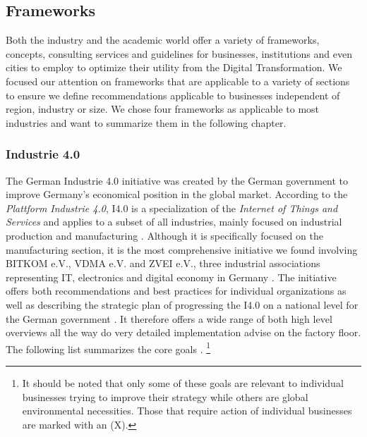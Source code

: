 \subsection{Frameworks}
\label{subsec:frameworks}



Both the industry and the academic world offer a variety of frameworks, concepts, consulting services and guidelines for businesses, institutions and even cities to employ to optimize their utility from the Digital Transformation.
We focused our attention on frameworks that are applicable to a variety of sections to ensure we define recommendations applicable to businesses independent of region, industry or size. 
We chose four frameworks as applicable to most industries and want to summarize them in the following chapter.

\subsubsection{Industrie 4.0}
The German Industrie 4.0 initiative was created by the German government to improve Germany's economical position in the global market. According to the \emph{Plattform Industrie 4.0}, I4.0 is a specialization of the \emph{Internet of Things and Services} and applies to a subset of all industries, mainly focused on industrial production and manufacturing
\cite[p.41]{umsetzungsstrategie:2015}. Although it is specifically focused on the manufacturing section, it is the most comprehensive initiative we found involving BITKOM e.V., VDMA e.V. and ZVEI e.V., three industrial associations representing IT, electronics and digital economy in Germany \cite{zveimembers:2016, vdmamembers:2016, bitkommembers:2016}. The initiative offers both recommendations and best practices for individual organizations \cite[p.40ff.]{umsetzungsstrategie:2015} as well as describing the strategic plan of progressing the \ac{I4.0} on a national level for the German government \cite[p.15ff.]{umsetzungsstrategie:2015}. It therefore offers a wide range of both high level overviews all the way do very detailed implementation advise on the factory floor.
 The following list summarizes the core goals \cite[p.8]{umsetzungsstrategie:2015}. \footnote{It should be noted that only some of these goals are relevant to individual businesses trying to improve their strategy while others are global environmental necessities. Those that require action of individual businesses are marked with an (X).}

